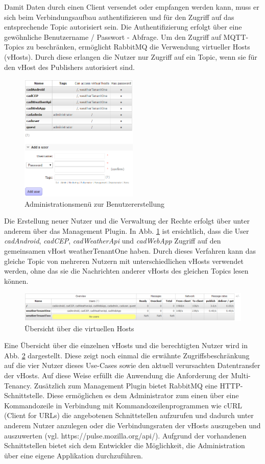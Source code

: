 Damit Daten durch einen Client versendet oder empfangen werden kann, muss er sich beim Verbindungsaufbau authentifizieren und für den Zugriff auf das entsprechende Topic autorisiert sein. Die Authentifizierung erfolgt über eine gewöhnliche Benutzername / Passwort - Abfrage. Um den Zugriff auf MQTT-Topics zu beschränken, ermöglicht RabbitMQ die Verwendung virtueller Hosts (vHosts). Durch diese erlangen die Nutzer nur Zugriff auf ein Topic, wenn sie für den vHost des Publishers autorisiert sind. 
\begin{figure}[htbp]
	\centering
	\includegraphics[width=0.5\textwidth]{Bilder/createUser.png}
	\caption{Administrationsmenü zur Benutzererstellung }
	\label{img:AdminCreateUser}
\end{figure}
Die Erstellung neuer Nutzer und die Verwaltung der Rechte erfolgt über unter anderem über das Management Plugin. In Abb. \ref{img:AdminCreateUser} ist ersichtlich, dass die User \textit{cadAndroid}, \textit{cadCEP}, \textit{cadWeatherApi} und \textit{cadWebApp} Zugriff auf den gemeinsamen vHost weatherTenantOne haben. Durch dieses Verfahren kann das gleiche Topic von mehreren Nutzern mit unterschiedlichen vHosts verwendet werden, ohne das sie die Nachrichten anderer vHosts des gleichen Topics lesen können. 
\begin{figure}[htbp]
	\centering
	\includegraphics[width=1.0\textwidth]{Bilder/vHostsOverview.png}
	\caption{Übersicht über die virtuellen Hosts}
	\label{img:vHostOverview}
\end{figure}
Eine Übersicht über die einzelnen vHosts und die berechtigten Nutzer wird in Abb. \ref{img:vHostOverview} dargestellt. Diese zeigt noch einmal die erwähnte Zugriffsbeschränkung auf die vier Nutzer dieses Use-Cases sowie den aktuell verursachten Datentransfer der vHosts. Auf diese Weise erfüllt die Anwendung die Anforderung der Multi-Tenancy. Zusätzlich zum Management Plugin bietet RabbitMQ eine HTTP-Schnittstelle. Diese ermöglichen es dem Administrator zum einen über eine Kommandozeile in Verbindung mit Kommandozeilenprogrammen wie cURL (Client for URLs) die angebotenen Schnittstellen aufzurufen und dadurch unter anderem Nutzer anzulegen oder die Verbindungsraten der vHosts auszugeben und auszuwerten (vgl. https://pulse.mozilla.org/api/). Aufgrund der vorhandenen Schnittstellen bietet sich dem Entwickler die Möglichkeit, die Administration über eine eigene Applikation durchzuführen. 